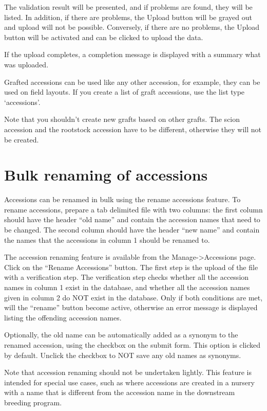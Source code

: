 \documentclass[
  12pt,
]{book}
\begin{document}
The validation result will be presented, and if problems are found, they will be listed. In addition, if there are problems, the Upload button will be grayed out and upload will not be possible. Conversely, if there are no problems, the Upload button will be activated and can be clicked to upload the data.

If the upload completes, a completion message is displayed with a summary what was uploaded.

Grafted accessions can be used like any other accession, for example, they can be used on field layouts. If you create a list of graft accessions, use the list type `accessions'.

Note that you shouldn't create new grafts based on other grafts. The scion accession and the rootstock accession have to be different, otherwise they will not be created.

\hypertarget{bulk-renaming-of-accessions}{%
\section{Bulk renaming of accessions}\label{bulk-renaming-of-accessions}}

Accessions can be renamed in bulk using the rename accessions feature. To rename accessions, prepare a tab delimited file with two columns: the first column should have the header ``old name'' and contain the accession names that need to be changed. The second column should have the header ``new name'' and contain the names that the accessions in column 1 should be renamed to.

The accession renaming feature is available from the Manage-\textgreater Accessions page. Click on the ``Rename Accessions'' button. The first step is the upload of the file with a verification step. The verification step checks whether all the accession names in column 1 exist in the database, and whether all the accession names given in column 2 do NOT exist in the database. Only if both conditions are met, will the ``rename'' button become active, otherwise an error message is displayed listing the offending accession names.

Optionally, the old name can be automatically added as a synonym to the renamed accession, using the checkbox on the submit form. This option is clicked by default. Unclick the checkbox to NOT save any old names as synonyms.

Note that accession renaming should not be undertaken lightly. This feature is intended for special use cases, such as where accessions are created in a nursery with a name that is different from the accession name in the downstream breeding program.
\end{document}
